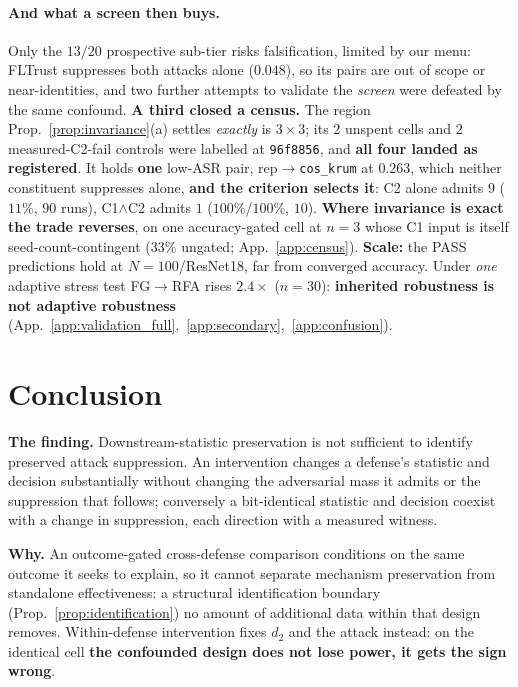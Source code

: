 \documentclass{article}
\begin{document}
\paragraph{And what a screen then buys.} Only the $13/20$ prospective sub-tier risks falsification, limited by our menu: FLTrust suppresses both attacks alone ($0.048$), so its pairs are out of scope or near-identities, and two further attempts to validate the \emph{screen} were defeated by the same confound. \textbf{A third closed a census.} The region Prop.~\ref{prop:invariance}(a) settles \emph{exactly} is $3\times3$; its $2$ unspent cells and $2$ measured-C2-fail controls were labelled at \texttt{96f8856}, and \textbf{all four landed as registered}. It holds \textbf{one} low-ASR pair, rep$\to$\texttt{cos\_krum} at $0.263$, which neither constituent suppresses alone, \textbf{and the criterion selects it}: C2 alone admits $9$ ($11\%$, $90$ runs), C1$\wedge$C2 admits $1$ ($100\%$/$100\%$, $10$). \textbf{Where invariance is exact the trade reverses}, on one accuracy-gated cell at $n{=}3$ whose C1 input is itself seed-count-contingent ($33\%$ ungated; App.~\ref{app:census}). \textbf{Scale:} the PASS predictions hold at $N{=}100$/ResNet18, far from converged accuracy. Under \emph{one} adaptive stress test FG$\to$RFA rises $2.4\times$ ($n{=}30$): \textbf{inherited robustness is not adaptive robustness} (App.~\ref{app:validation_full},~\ref{app:secondary},~\ref{app:confusion}).

\section{Conclusion}
\label{sec:conclusion}

\textbf{The finding.} Downstream-statistic preservation is not sufficient to identify preserved attack suppression. An intervention changes a defense's statistic and decision substantially without changing the adversarial mass it admits or the suppression that follows; conversely a bit-identical statistic and decision coexist with a change in suppression, each direction with a measured witness.

\textbf{Why.} An outcome-gated cross-defense comparison conditions on the same outcome it seeks to explain, so it cannot separate mechanism preservation from standalone effectiveness: a structural identification boundary (Prop.~\ref{prop:identification}) no amount of additional data within that design removes. Within-defense intervention fixes $d_2$ and the attack instead: on the identical cell \textbf{the confounded design does not lose power, it gets the sign wrong}.
\end{document}

